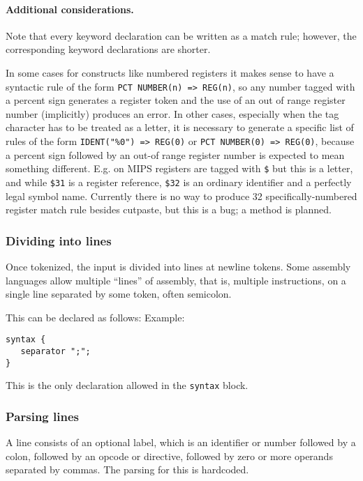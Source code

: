 \paragraph{Additional considerations.}
Note that every keyword declaration can be written as a match rule;
however, the corresponding keyword declarations are shorter.

In some cases for constructs like numbered registers it makes sense to
have a syntactic rule of the form \texttt{PCT NUMBER(n) => REG(n)}, so
any number tagged with a percent sign generates a register token and
the use of an out of range register number (implicitly) produces an
error.
In other cases, especially when the tag character has to be treated as
a letter, it is necessary to generate a specific list of
rules of the form
\texttt{IDENT("\%0") => REG(0)} or
\texttt{PCT NUMBER(0) => REG(0)},
because a percent sign followed by an out-of range register number is
expected to mean something different.
E.g. on MIPS registers are tagged with \texttt{\$} but this is a
letter, and while \texttt{\$31} is a register reference, \texttt{\$32}
is an ordinary identifier and a perfectly legal symbol name.
Currently there is no way to produce 32 specifically-numbered register
match rule besides cutpaste, but this is a bug; a method is planned. %

\subsubsection{Dividing into lines}

Once tokenized, the input is divided into lines at newline tokens.
Some assembly languages allow multiple ``lines'' of assembly, that is,
multiple instructions, on a single line separated by some token, often
semicolon.

This can be declared as follows:
Example:
\begin{verbatim}
syntax {
   separator ";";
}
\end{verbatim}
This is the only declaration allowed in the \texttt{syntax} block.

\subsubsection{Parsing lines}

A line consists of an optional label, which is an identifier or number
followed by a colon, followed by an opcode or directive, followed by
zero or more operands separated by commas.
The parsing for this is hardcoded.


